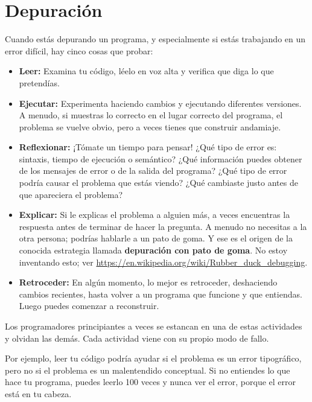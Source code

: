 \section{Depuración}

Cuando estás depurando un programa, y especialmente si estás trabajando en un error difícil, hay cinco cosas que probar:

\begin{itemize}
    \item \textbf{Leer:} Examina tu código, léelo en voz alta y verifica que diga lo que pretendías.
    
    \item \textbf{Ejecutar:} Experimenta haciendo cambios y ejecutando diferentes versiones. A menudo, si muestras lo correcto en el lugar correcto del programa, el problema se vuelve obvio, pero a veces tienes que construir andamiaje.
    
    \item \textbf{Reflexionar:} ¡Tómate un tiempo para pensar! ¿Qué tipo de error es: sintaxis, tiempo de ejecución o semántico? ¿Qué información puedes obtener de los mensajes de error o de la salida del programa? ¿Qué tipo de error podría causar el problema que estás viendo? ¿Qué cambiaste justo antes de que apareciera el problema?
    
    \item \textbf{Explicar:} Si le explicas el problema a alguien más, a veces encuentras la respuesta antes de terminar de hacer la pregunta. A menudo no necesitas a la otra persona; podrías hablarle a un pato de goma. Y ese es el origen de la conocida estrategia llamada \textbf{depuración con pato de goma}. No estoy inventando esto; ver \url{https://en.wikipedia.org/wiki/Rubber_duck_debugging}.
    
    \item \textbf{Retroceder:} En algún momento, lo mejor es retroceder, deshaciendo cambios recientes, hasta volver a un programa que funcione y que entiendas. Luego puedes comenzar a reconstruir.
\end{itemize}

Los programadores principiantes a veces se estancan en una de estas actividades y olvidan las demás. Cada actividad viene con su propio modo de fallo.

Por ejemplo, leer tu código podría ayudar si el problema es un error tipográfico, pero no si el problema es un malentendido conceptual. Si no entiendes lo que hace tu programa, puedes leerlo 100 veces y nunca ver el error, porque el error está en tu cabeza.

